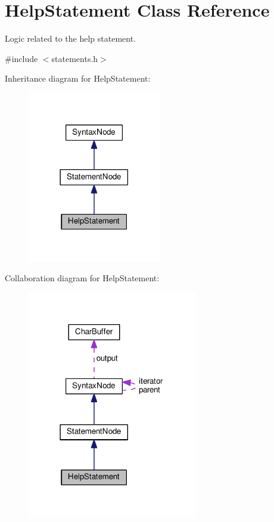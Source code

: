 \hypertarget{classHelpStatement}{}\section{Help\+Statement Class Reference}
\label{classHelpStatement}


Logic related to the help statement.  




{\ttfamily \#include $<$statements.\+h$>$}



Inheritance diagram for Help\+Statement\+:\nopagebreak
\begin{figure}[H]
\begin{center}
\leavevmode
\includegraphics[width=165pt]{classHelpStatement__inherit__graph}
\end{center}
\end{figure}


Collaboration diagram for Help\+Statement\+:\nopagebreak
\begin{figure}[H]
\begin{center}
\leavevmode
\includegraphics[width=210pt]{classHelpStatement__coll__graph}
\end{center}
\end{figure}
